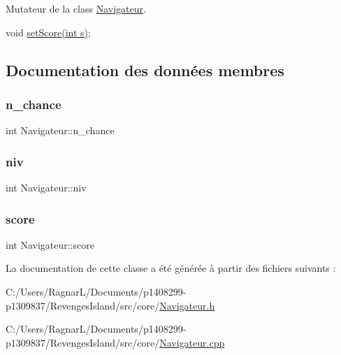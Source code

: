 Mutateur de la class \hyperlink{class_navigateur}{Navigateur}. 

void \hyperlink{class_navigateur_a85b21f5d57ed9e03e3276c369eb00fd7}{set\+Score(int s)}; 

\subsection{Documentation des données membres}
\mbox{\label{class_navigateur_ab6a02c421ddd9d1d5951530b82db6573}} 
\subsubsection{\texorpdfstring{n\+\_\+chance}{n\_chance}}
{\footnotesize\ttfamily int Navigateur\+::n\+\_\+chance\hspace{0.3cm}{\ttfamily [private]}}

\mbox{\label{class_navigateur_a1451d9d6397ad3869617876b178324e9}} 
\subsubsection{\texorpdfstring{niv}{niv}}
{\footnotesize\ttfamily int Navigateur\+::niv\hspace{0.3cm}{\ttfamily [private]}}

\mbox{\label{class_navigateur_acfbec2e6b65cfe62b591becb70ea0105}} 
\subsubsection{\texorpdfstring{score}{score}}
{\footnotesize\ttfamily int Navigateur\+::score\hspace{0.3cm}{\ttfamily [private]}}



La documentation de cette classe a été générée à partir des fichiers suivants \+:\begin{DoxyCompactItemize}
\item 
C\+:/\+Users/\+Ragnar\+L/\+Documents/p1408299-\/p1309837/\+Revenges\+Island/src/core/\hyperlink{_navigateur_8h}{Navigateur.\+h}\item 
C\+:/\+Users/\+Ragnar\+L/\+Documents/p1408299-\/p1309837/\+Revenges\+Island/src/core/\hyperlink{_navigateur_8cpp}{Navigateur.\+cpp}\end{DoxyCompactItemize}
